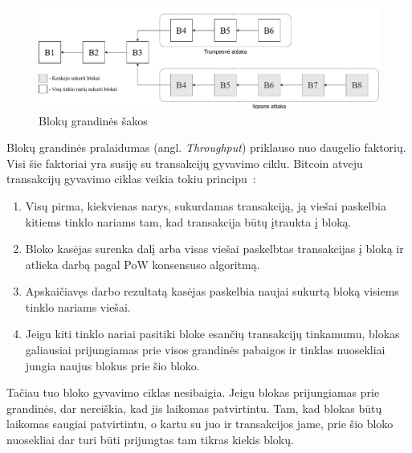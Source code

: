 \begin{figure}[H]
    \centering
    \includegraphics[scale=0.45]{images/blockchain-branches}
    \caption{Blokų grandinės šakos~\cite{zheng2017overview}}
    \label{img:7}
\end{figure}




 \label{subsection:blockchain-throughput}

Blokų grandinės pralaidumas (angl. \textit{Throughput}) priklauso nuo daugelio faktorių. Visi šie faktoriai yra susiję su transakcijų gyvavimo ciklu. Bitcoin atveju transakcijų gyvavimo ciklas veikia tokiu principu~\cite{nakamoto2008bitcoin}:
\begin{enumerate}
    \item Visų pirma, kiekvienas narys, sukurdamas transakciją, ją viešai paskelbia kitiems tinklo nariams tam, kad transakcija būtų įtraukta į bloką. 
    \item Bloko kasėjas surenka dalį arba visas viešai paskelbtas transakcijas į bloką ir atlieka darbą pagal PoW konsensuso algoritmą.
    \item Apskaičiavęs darbo rezultatą kasėjas paskelbia naujai sukurtą bloką visiems tinklo nariams viešai. 
    \item Jeigu kiti tinklo nariai pasitiki bloke esančių transakcijų tinkamumu, blokas galiausiai prijungiamas prie visos grandinės pabaigos ir tinklas nuosekliai jungia naujus blokus prie šio bloko. 
\end{enumerate}

Tačiau tuo bloko gyvavimo ciklas nesibaigia. Jeigu blokas prijungiamas prie grandinės, dar nereiškia, kad jis laikomas patvirtintu. Tam, kad blokas būtų laikomas saugiai patvirtintu, o kartu su juo ir transakcijos jame, prie šio bloko nuosekliai dar turi būti prijungtas tam tikras kiekis blokų. 

